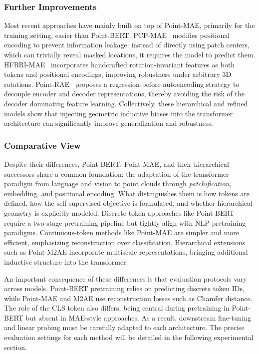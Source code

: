 \subsubsection{Further Improvements}
\label{sssec:further_improvements}

Most recent approaches have mainly built on top of Point-MAE, primarily for the training setting, easier than Point-BERT. PCP-MAE~\cite{pcpmae} modifies positional encoding to prevent information leakage: instead of directly using patch centers, which can trivially reveal masked locations, it requires the model to predict them. HFBRI-MAE~\cite{hfbrimae} incorporates handcrafted rotation-invariant features as both tokens and positional encodings, improving robustness under arbitrary 3D rotations. Point-RAE~\cite{prae} proposes a regression-before-autoencoding strategy to decouple encoder and decoder representations, thereby avoiding the risk of the decoder dominating feature learning. Collectively, these hierarchical and refined models show that injecting geometric inductive biases into the transformer architecture can significantly improve generalization and robustness.

\subsubsection{Comparative View}
\label{sssec:comparative_view}

Despite their differences, Point-BERT, Point-MAE, and their hierarchical successors share a common foundation: the adaptation of the transformer paradigm from language and vision to point clouds through \textit{patchification}, embedding, and positional encoding. What distinguishes them is how tokens are defined, how the self-supervised objective is formulated, and whether hierarchical geometry is explicitly modeled. Discrete-token approaches like Point-BERT require a two-stage pretraining pipeline but tightly align with NLP pretraining paradigms. Continuous-token methods like Point-MAE are simpler and more efficient, emphasizing reconstruction over classification. Hierarchical extensions such as Point-M2AE incorporate multiscale representations, bringing additional inductive structure into the transformer.

An important consequence of these differences is that evaluation protocols vary across models. Point-BERT pretraining relies on predicting discrete token IDs, while Point-MAE and M2AE use reconstruction losses such as Chamfer distance. The role of the CLS token also differs, being central during pretraining in Point-BERT but absent in MAE-style approaches. As a result, downstream fine-tuning and linear probing must be carefully adapted to each architecture. The precise evaluation settings for each method will be detailed in the following experimental section.


